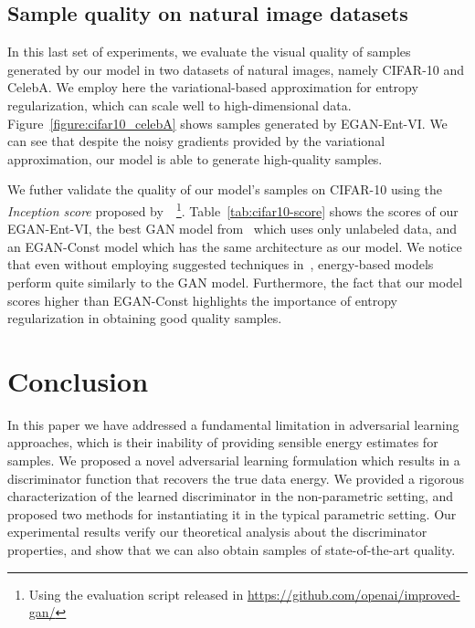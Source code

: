 \documentclass[a4paper]{article}
\begin{document}
\subsection{Sample quality on natural image datasets}
In this last set of experiments, we evaluate the visual quality of samples generated by our model in two datasets of natural images, namely CIFAR-10 and CelebA. We employ here the variational-based approximation for entropy regularization, which can scale well to high-dimensional data. Figure~\ref{figure:cifar10_celebA} shows samples generated by EGAN-Ent-VI. We can see that despite the noisy gradients provided by the variational approximation, our model is able to generate high-quality samples.
\begin{figure}[t!]
\begin{floatrow}
\end{floatrow}
\end{figure}

We futher validate the quality of our model's samples on CIFAR-10 using the \textit{Inception score} proposed by~\citep{salimans2016improved}~\footnote{Using the evaluation script released in \url{https://github.com/openai/improved-gan/}}. Table~\ref{tab:cifar10-score} shows the scores of our EGAN-Ent-VI, the best GAN model from~\cite{salimans2016improved} which uses only unlabeled data, and an EGAN-Const model which has the same architecture as our model. 
We notice that even without employing suggested techniques in~\cite{salimans2016improved}, energy-based models perform quite similarly to the GAN model. Furthermore, the fact that our model scores higher than EGAN-Const highlights the importance of entropy regularization in obtaining good quality samples.


%
 \section{Conclusion}
In this paper we have addressed a fundamental limitation in adversarial learning approaches, which is their inability of providing sensible energy estimates for samples. 
We proposed a novel adversarial learning formulation which results in a discriminator function that recovers the true data energy. 
We provided a rigorous characterization of the learned discriminator in the non-parametric setting, and proposed two methods for instantiating it in the typical parametric setting. 
Our experimental results verify our theoretical analysis about the discriminator properties, and show that we can also obtain samples of state-of-the-art quality.
\end{document}
